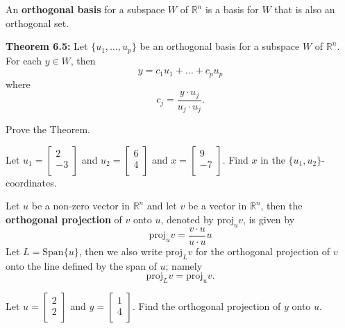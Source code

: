 \documentclass[12pt,letterpaper]{article}
\begin{document}
\newpage

\begin{defn} An {\bf orthogonal basis} for a subspace $W$ of $\mathbb{R}^n$ is a basis for $W$ that is also an orthogonal set.
\end{defn}

{\bf Theorem 6.5:} Let $\{u_1, \dots,u_p\}$ be an orthogonal basis for a subspace $W$ of $\mathbb{R}^n$. For each $y\in W$, then $$y=c_1 u_1+\dots+c_p u_p$$ where $$c_j=\frac{y\cdot u_j}{u_j \cdot u_j}.$$

\begin{enumerate}

\Problem Prove the Theorem.





\vfill


\Problem Let $u_1=\begin{bmatrix} 2\\ -3\\ \end{bmatrix}$ and $u_2= \begin{bmatrix} 6\\4\\ \end{bmatrix}$ and $x=\begin{bmatrix} 9\\ -7\\ \end{bmatrix}$. Find $x$ in the $\{u_1, u_2\}$-coordinates.

\vfill


\newpage

\begin{defn} Let $u$ be a non-zero vector in $\mathbb{R}^n$ and let $v$ be a vector in $\mathbb{R}^n$, then the {\bf orthogonal projection} of $v$ onto $u$, denoted by $\text{proj}_{u}{v}$, is given by $$\text{proj}_{u}{v}=\frac{v\cdot u}{u \cdot u} u$$ Let $L=\text{Span}\{ u\}$, then we also write $\text{proj}_{L}{v}$ for the orthogonal projection of $v$ onto the line defined by the span of $u$; namely $$\text{proj}_{L}{v}=\text{proj}_{u}{v}.$$
\end{defn}

\Problem Let $u=\begin{bmatrix} 2\\ 2\\ \end{bmatrix}$ and $y= \begin{bmatrix} 1\\4\\ \end{bmatrix}$. Find the orthogonal projection of $y$ onto $u$.


\end{enumerate}
\end{document}
